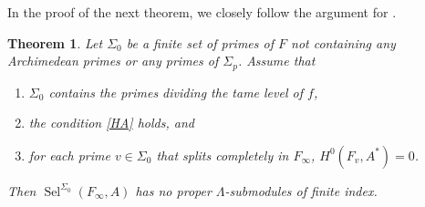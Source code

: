 \documentclass[12 pt]{amsart}
\theoremstyle{plain}
\newtheorem{thm}{Theorem}[section]
\theoremstyle{definition}
\numberwithin{equation}{section}
\numberwithin{table}{section}
\begin{document}
\indent In the proof of the next theorem, we closely follow the argument for \cite[Proposition 2.5]{GV00}.\begin{thm}
\label{no-subs-non-prim}
Let $\Sigma_0$ be a finite set of primes of $F$ not containing any Archimedean primes or any primes of $\Sigma_p$. Assume that
\begin{enumerate}
\item $\Sigma_0$ contains the primes dividing the tame level of $f$,
\item the condition \emph{\cref{HA}} holds, and
\item for each prime $v\in\Sigma_0$ that splits completely in $F_\infty$, $H^0(F_v,A^*)=0$.
\end{enumerate}
Then $\operatorname{Sel}^{\Sigma_0}(F_\infty,A)$ has no proper $\Lambda$-submodules of finite index.
\end{thm}
\end{document}
